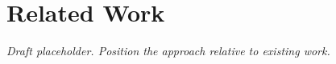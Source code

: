 \section{Related Work}
\label{sec:related-work}
\emph{Draft placeholder. Position the approach relative to existing work.}
